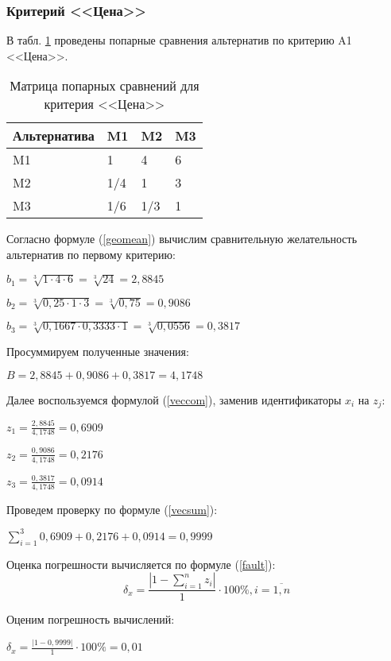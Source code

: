\subsubsection{Критерий <<Цена>>}

В табл. \ref{cost} проведены попарные сравнения альтернатив по критерию A1 <<Цена>>.
\begin{table}[H]
  \caption{Матрица попарных сравнений для критерия <<Цена>>}\label{cost}
  \begin{tabular}{|l|l|l|l|}
  \hline Альтернатива & M1 & M2 & M3 \\
  \hline M1 & 1 & 4 & 6 \\
  \hline M2 & 1/4 & 1 & 3 \\
  \hline M3 & 1/6 & 1/3 & 1 \\
  \hline
  \end{tabular}
\end{table}

Согласно формуле (\ref{geomean}) вычислим сравнительную желательность альтернатив по первому критерию:

$b_1 = \sqrt[3]{1 \cdot 4 \cdot 6} = \sqrt[3]{24} = 2,8845$

$b_2 = \sqrt[3]{0,25 \cdot 1 \cdot 3} = \sqrt[3]{0,75} = 0,9086$

$b_3 = \sqrt[3]{0,1667 \cdot 0,3333 \cdot 1} = \sqrt[3]{0,0556} = 0,3817$

Просуммируем полученные значения:

$B = 2,8845 + 0,9086 + 0,3817 = 4,1748$

Далее воспользуемся формулой (\ref{veccom}), заменив идентификаторы $x_i$ на $z_j$:

$z_1 = \frac{2,8845}{4,1748} = 0,6909$

$z_2 = \frac{0,9086}{4,1748} = 0,2176$

$z_3 = \frac{0,3817}{4,1748} = 0,0914$

Проведем проверку по формуле (\ref{vecsum}):

$\sum_{i=1}^{3} 0,6909 + 0,2176 + 0,0914 = 0,9999$

Оценка погрешности вычисляется по формуле (\ref{fault}):
\begin{equation}\label{fault}
\delta_{x} = \frac{|1 - \sum_{i=1}^{n} z_i|}{1} \cdot 100\%, i = \overline{1,n}
\end{equation}

Оценим погрешность вычислений:

$\delta_{x} = \frac{|1 - 0,9999|}{1} \cdot 100\% = 0,01$

